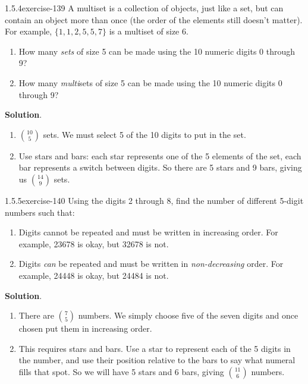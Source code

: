 \documentclass[twoside,11pt,]{book}
\numberwithin{equation}{chapter}
\begin{document}
\begin{divisionsolution}{1.5.4}{}{exercise-139}%
\hypertarget{p-2286}{}%
A multiset is a collection of objects, just like a set, but can contain an object more than once (the order of the elements still doesn't matter). For example, \(\{1,1, 2, 5, 5, 7\}\) is a multiset of size 6.\leavevmode%
\begin{enumerate}[label=(\alph*)]
\item\hypertarget{li-1409}{}\hypertarget{p-2287}{}%
How many \emph{sets} of size 5 can be made using the 10 numeric digits 0 through 9?%
\item\hypertarget{li-1410}{}\hypertarget{p-2289}{}%
How many \emph{multi}sets of size 5 can be made using the 10 numeric digits 0 through 9?%
\end{enumerate}
%
\par\smallskip%
\noindent\textbf{Solution}.\quad%
\hypertarget{p-2291}{}%
\leavevmode%
\begin{enumerate}[label=(\alph*)]
\item\hypertarget{li-1411}{}\hypertarget{p-2292}{}%
\({10\choose 5}\) sets. We must select 5 of the 10 digits to put in the set.%
\item\hypertarget{li-1412}{}\hypertarget{p-2293}{}%
Use stars and bars: each star represents one of the 5 elements of the set, each bar represents a switch between digits. So there are 5 stars and 9 bars, giving us \({14 \choose 9}\) sets.%
\end{enumerate}
%
\end{divisionsolution}%
\begin{divisionsolution}{1.5.5}{}{exercise-140}%
\hypertarget{p-2302}{}%
Using the digits 2 through 8, find the number of different 5-digit numbers such that:\leavevmode%
\begin{enumerate}[label=(\alph*)]
\item\hypertarget{li-1417}{}\hypertarget{p-2303}{}%
Digits cannot be repeated and must be written in increasing order. For example, 23678 is okay, but 32678 is not.%
\item\hypertarget{li-1418}{}\hypertarget{p-2305}{}%
Digits \emph{can} be repeated and must be written in \emph{non-decreasing} order. For example, 24448 is okay, but 24484 is not.%
\end{enumerate}
%
\par\smallskip%
\noindent\textbf{Solution}.\quad%
\hypertarget{p-2307}{}%
\leavevmode%
\begin{enumerate}[label=(\alph*)]
\item\hypertarget{li-1419}{}\hypertarget{p-2308}{}%
There are \({7 \choose 5}\) numbers. We simply choose five of the seven digits and once chosen put them in increasing order.%
\item\hypertarget{li-1420}{}\hypertarget{p-2309}{}%
This requires stars and bars. Use a star to represent each of the 5 digits in the number, and use their position relative to the bars to say what numeral fills that spot. So we will have 5 stars and 6 bars, giving \({11 \choose 6}\) numbers.%
\end{enumerate}
%
\end{divisionsolution}%
\end{document}
